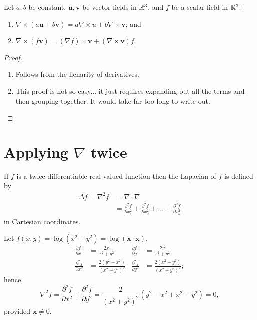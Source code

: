 \begin{proposition}
    Let $a, b$ be constant, $\bm u, \bm v$ be vector fields in $\mathbb{R}^3$, and $f$ be a scalar field in $\mathbb{R}^3$:
    \begin{enumerate}
        \item $\nabla \times (a\bm u + b\bm v) = a \nabla \times u + b \nabla \times \bm v$; and
        \item $\nabla \times (f \bm v) = (\nabla f) \times \bm v + (\nabla \times \bm v)f$.
    \end{enumerate}
\end{proposition}

\begin{proof}
    \begin{enumerate}
        \item Follows from the lienarity of derivatives.

        \item This proof is not so easy... it just requires expanding out all the terms and then grouping together. It would take far too long to write out.
    \end{enumerate}
\end{proof}

\section{Applying $\nabla$ twice}

\begin{definition}
    If $f$ is a twice-differentiable real-valued function then the Lapacian of $f$ is defined by
    \begin{align*}
        \Delta f = \nabla^2 f &= \nabla \cdot \nabla \\
                              &= \frac{\partial^2f}{\partial x_1^2} + \frac{\partial^2f}{\partial x_2^2} + \ldots + \frac{\partial^2f}{\partial x_n^2}
    \end{align*}
    in Cartesian coordinates.
\end{definition}

\begin{example}
    Let $f(x, y) = \log{(x^2 + y^2)} = \log{(\bm x \cdot \bm x)}$. 
    \begin{align*}
        \frac{\partial f}{\partial x} &= \frac{2x}{x^2 + y^2} & \frac{\partial f}{\partial y} &= \frac{2y}{x^2 + y^2} \\
        \frac{\partial^2 f}{\partial x^2} &= \frac{2(y^2 - x^2)}{(x^2 + y^2)^2} & \frac{\partial^2 f}{\partial y^2} &= \frac{2(x^2 - y^2)}{(x^2 + y^2)^2}; 
    \end{align*}
    hence,
    \[ \nabla^2f = \frac{\partial^2 f}{\partial x^2} + \frac{\partial^2 f}{\partial y^2} = \frac{2}{(x^2 + y^2)^2} (y^2 - x^2 + x^2 - y^2) = 0, \]
    provided $\bm x \neq 0$.
\end{example}

